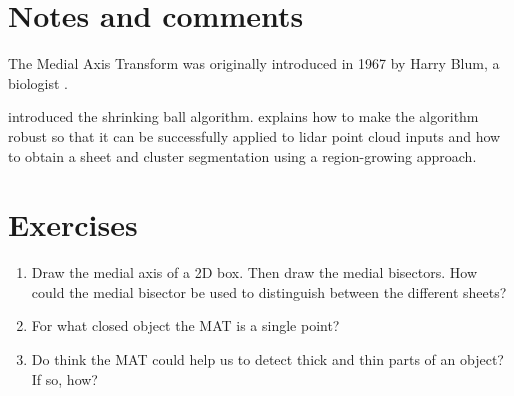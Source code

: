 \section{Notes and comments}
The Medial Axis Transform was originally introduced in 1967 by Harry Blum, a biologist \citep{Blum67}.

\citet{Ma12} introduced the shrinking ball algorithm. \citet{Peters18} explains how to make the algorithm robust so that it can be successfully applied to lidar point cloud inputs and how to obtain a sheet and cluster segmentation using a region-growing approach.


%
\section{Exercises}

\begin{enumerate}
  \item Draw the medial axis of a 2D box. Then draw the medial bisectors. How could the medial bisector be used to distinguish between the different sheets?
  \item For what closed object the MAT is a single point?
  \item Do think the MAT could help us to detect thick and thin parts of an object? If so, how?
\end{enumerate}